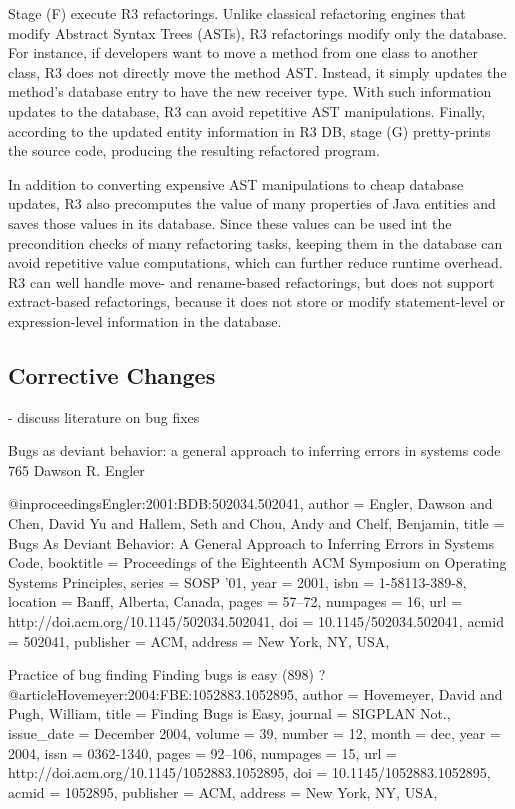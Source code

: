 \documentclass[runningheads,a4paper]{llncs}
\begin{document}
Stage (F) execute R3 refactorings. Unlike classical refactoring engines that modify Abstract Syntax Trees (ASTs), R3 refactorings modify only the database. For instance, if developers want to move a method from one class to another class, R3 does not directly move the method AST. Instead, it simply updates the method's database entry to have the new receiver type. With such information updates to the database, R3 can avoid repetitive AST manipulations. Finally, according to the updated entity information in R3 DB, stage (G) pretty-prints the source code, producing the resulting refactored program.

In addition to converting expensive AST manipulations to cheap database updates, R3 also precomputes the value of many properties of Java entities and saves those values in its database. Since these values can be used int the precondition checks of many refactoring tasks, keeping them in the database can avoid repetitive value computations, which can further reduce runtime overhead. R3 can well handle move- and rename-based refactorings, but does not support extract-based refactorings, because it does not store or modify statement-level or expression-level information in the database.  

\subsection{Corrective Changes} 
	- discuss literature on bug fixes  



Bugs as deviant behavior: a general approach to inferring errors in systems code  765 Dawson R. Engler

@inproceedings{Engler:2001:BDB:502034.502041,
 author = {Engler, Dawson and Chen, David Yu and Hallem, Seth and Chou, Andy and Chelf, Benjamin},
 title = {Bugs As Deviant Behavior: A General Approach to Inferring Errors in Systems Code},
 booktitle = {Proceedings of the Eighteenth ACM Symposium on Operating Systems Principles},
 series = {SOSP '01},
 year = {2001},
 isbn = {1-58113-389-8},
 location = {Banff, Alberta, Canada},
 pages = {57--72},
 numpages = {16},
 url = {http://doi.acm.org/10.1145/502034.502041},
 doi = {10.1145/502034.502041},
 acmid = {502041},
 publisher = {ACM},
 address = {New York, NY, USA},
} 


Practice of bug finding
Finding bugs is easy (898) ?
@article{Hovemeyer:2004:FBE:1052883.1052895,
 author = {Hovemeyer, David and Pugh, William},
 title = {Finding Bugs is Easy},
 journal = {SIGPLAN Not.},
 issue_date = {December 2004},
 volume = {39},
 number = {12},
 month = dec,
 year = {2004},
 issn = {0362-1340},
 pages = {92--106},
 numpages = {15},
 url = {http://doi.acm.org/10.1145/1052883.1052895},
 doi = {10.1145/1052883.1052895},
 acmid = {1052895},
 publisher = {ACM},
 address = {New York, NY, USA},
} 
\end{document}
